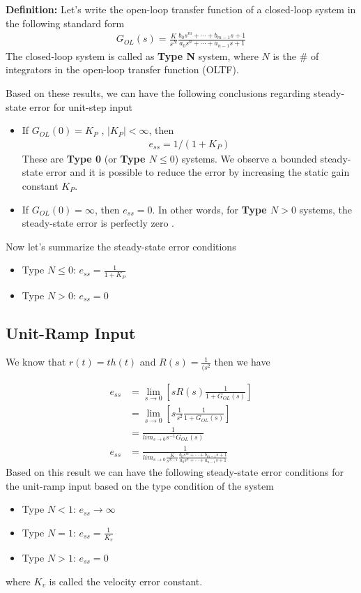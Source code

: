 \documentclass[twoside]{article}
\begin{document}
\textbf{Definition:} Let's write the open-loop transfer function of a closed-loop
system in the following standard form
%
\begin{align*}
G_{OL}(s) = \frac{K}{s^N} \frac{b_0 s^m + \cdots + b_{m-1} s + 1}{a_0 s^n + \cdots + a_{n-1} s + 1}
\end{align*}
%
The closed-loop system is called as \textbf{Type N} system, where
$N$ is the $\#$ of integrators in the open-loop transfer function (OLTF).

Based on these results, we can have the following conclusions
regarding steady-state error for unit-step input
%
\begin{itemize}
\item If $G_{OL} (0) = K_P$ , $| K_{P} | < \infty$, then 
\begin{align*}
e_{ss} =1/(1 + K_{P})
\end{align*}
% 
These are \textbf{Type 0} (or \textbf{Type $N \leq 0$})
systems. We observe a bounded steady-state error and it is possible to reduce the error by increasing the static gain
constant $K_P$. 
%
\item  If $G_{OL} (0) = \infty$, then $e_{ss} = 0$. In other words, for 
  \textbf{Type $N > 0$} systems, the steady-state error is perfectly zero .
\end{itemize}

Now let's summarize the steady-state error conditions
%
\begin{itemize}
\item Type $N \leq 0$: $e_{ss} =  \frac{1}{1 + K_{P}}$
\item Type $N > 0$: $e_{ss} = 0$
\end{itemize}

\subsection*{Unit-Ramp Input}
%
We know that $r(t) = t h(t)$ and $R(s) = \frac{1}{(s^2}$ then
we have

\begin{align*}
e_{ss} &= \lim_{s \to 0} \left[ s R(s) \frac{1}{1
         + G_{OL} (s) } \right]
\\
&= \lim_{s \to 0} \left[ s \frac{1}{s^2} \frac{1}{1
         + G_{OL} (s) } \right]
\\
 &= \frac{1}{lim_{s \to 0} s^{-1} G_{OL} (s) }
\\
e_{ss} &= \frac{1}{lim_{s \to 0} \frac{K}{s^{N-1}} \frac{b_0 s^m + \cdots + b_{m-1} s + 1}{a_0 s^n + \cdots + a_{n-1} s + 1} }
\end{align*}
%
Based on this result we can have the following steady-state
error conditions for the unit-ramp input based on the type 
condition of the system
%
\begin{itemize}
\item Type $N < 1$: $e_{ss} \to  \infty$
\item Type $N = 1$: $e_{ss} = \frac{1}{K_v}$
\item Type $N > 1$: $e_{ss} = 0$
\end{itemize}
%
where $K_v$ is called the velocity error constant.
 
\end{document}
